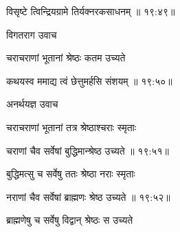 
{\devanagarifont विसृष्टे त्विन्द्रियग्रामे तिर्यक्नरकसाधनम् {॥ १९:४९॥} \veg\dontdisplaylinenum }%

{\devanagarifont विगतराग उवाच {\dandab}\dontdisplaylinenum  }%
 
{\devanagarifont चराचराणां भूतानां श्रेष्ठः कतम उच्यते \thinspace{\danda} \dontdisplaylinenum }%


{\devanagarifont कथयस्व ममाद्य त्वं छेत्तुमर्हसि संशयम् {॥ १९:५०॥} \veg\dontdisplaylinenum }%

{\devanagarifont अनर्थयज्ञ उवाच {\dandab}\dontdisplaylinenum  }%
 
{\devanagarifont चराचराणां भूतानां तत्र श्रेष्ठाश्चराः स्मृताः \thinspace{\danda} \dontdisplaylinenum }%


{\devanagarifont चराणां चैव सर्वेषां बुद्धिमान्श्रेष्ठ उच्यते {॥ १९:५१॥} \veg\dontdisplaylinenum }%

{\devanagarifont बुद्धिमत्सु च सर्वेषु ततः श्रेष्ठा नराः स्मृताः \thinspace{\dandab} \dontdisplaylinenum }%


{\devanagarifont नराणां चैव सर्वेषां ब्राह्मणः श्रेष्ठ उच्यते {॥ १९:५२॥} \veg\dontdisplaylinenum }%

{\devanagarifont ब्राह्मणेषु च सर्वेषु विद्वान् श्रेष्ठः स उच्यते  \thinspace{\dandab} \dontdisplaylinenum }%

